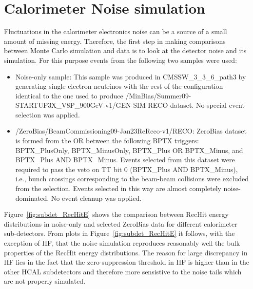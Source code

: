 \section{Calorimeter Noise simulation}
\label{sc:CaloNoise}

Fluctuations in the calorimeter electronics noise can be a source of a small amount of missing energy. Therefore, the first step
in making comparisons between Monte Carlo simulation and data is to look at the detector noise and its simulation. For this purpose
events from the following two samples were used:

\begin{itemize}
  \item Noise-only sample: \newline
This sample was produced in CMSSW\_3\_3\_6\_path3 by generating single electron neutrinos with the rest of the configuration identical to the one used to
produce /MinBias/Summer09-STARTUP3X\_V8P\_900GeV-v1/GEN-SIM-RECO dataset. No special event selection was applied.

  \item /ZeroBias/BeamCommissioning09-Jan23ReReco-v1/RECO: \newline
ZeroBias dataset is formed from the OR between the following BPTX triggers: BPTX\_PlusOnly, BPTX\_MinusOnly, BPTX\_Plus
OR BPTX\_Minus, and BPTX\_Plus AND BPTX\_Minus. Events selected from this dataset were required to pass the
veto on TT bit 0 (BPTX\_Plus AND BPTX\_Minus), i.e., bunch crossings corresponding to the beam-beam
collisions were excluded from the selection. Events selected in this way are almost completely noise-dominated. No event cleanup was applied.
\end{itemize}

Figure~\ref{fig:subdet_RecHitE} shows the comparison between RecHit energy distributions in noise-only and selected ZeroBias data for different
calorimeter sub-detectors. From plots in Figure~\ref{fig:subdet_RecHitE} it follows, with the exception of HF, that
the noise simulation reproduces reasonably well the bulk properties of the RecHit energy distributions. The reason for large discrepancy in HF lies 
in the fact that the zero-suppression threshold in HF is higher than in the other HCAL subdetectors and therefore more sensistive to the noise tails
which are not properly simulated. 

